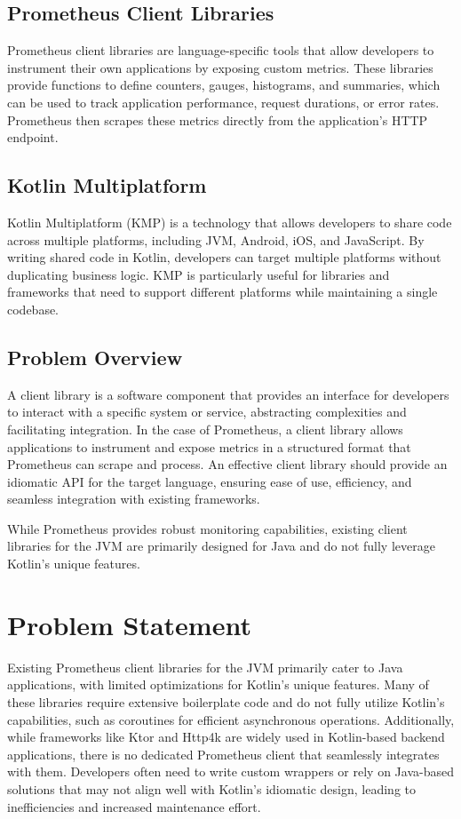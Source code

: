 \documentclass[a4paper,twoside,11pt]{article}
\begin{document}
\subsection{Prometheus Client Libraries}
Prometheus client libraries\cite{clientlibraries:prometheus} are language-specific tools that allow developers to instrument their own applications by exposing custom metrics. These libraries provide functions to define counters, gauges, histograms, and summaries, which can be used to track application performance, request durations, or error rates. Prometheus then scrapes these metrics directly from the application's HTTP endpoint. 

\subsection{Kotlin Multiplatform}
Kotlin Multiplatform\cite{kotlinmultiplatform:jetbrains} (KMP) is a technology that allows developers to share code across multiple platforms, including JVM, Android, iOS, and JavaScript. By writing shared code in Kotlin, developers can target multiple platforms without duplicating business logic. KMP is particularly useful for libraries and frameworks that need to support different platforms while maintaining a single codebase.


\subsection{Problem Overview}
A client library is a software component that provides an interface for developers to interact with a specific system or service, abstracting complexities and facilitating integration. In the case of Prometheus, a client library allows applications to instrument and expose metrics in a structured format that Prometheus can scrape and process. An effective client library should provide an idiomatic API for the target language, ensuring ease of use, efficiency, and seamless integration with existing frameworks.

While Prometheus provides robust monitoring capabilities, existing client libraries for the JVM are primarily designed for Java and do not fully leverage Kotlin’s unique features.

\section{Problem Statement}
Existing Prometheus client libraries for the JVM primarily cater to Java applications, with limited optimizations for Kotlin’s unique features. Many of these libraries require extensive boilerplate code and do not fully utilize Kotlin’s capabilities, such as coroutines for efficient asynchronous operations.
Additionally, while frameworks like Ktor and Http4k are widely used in Kotlin-based backend applications, there is no dedicated Prometheus client that seamlessly integrates with them. Developers often need to write custom wrappers or rely on Java-based solutions that may not align well with Kotlin’s idiomatic design, leading to inefficiencies and increased maintenance effort.
\end{document}
